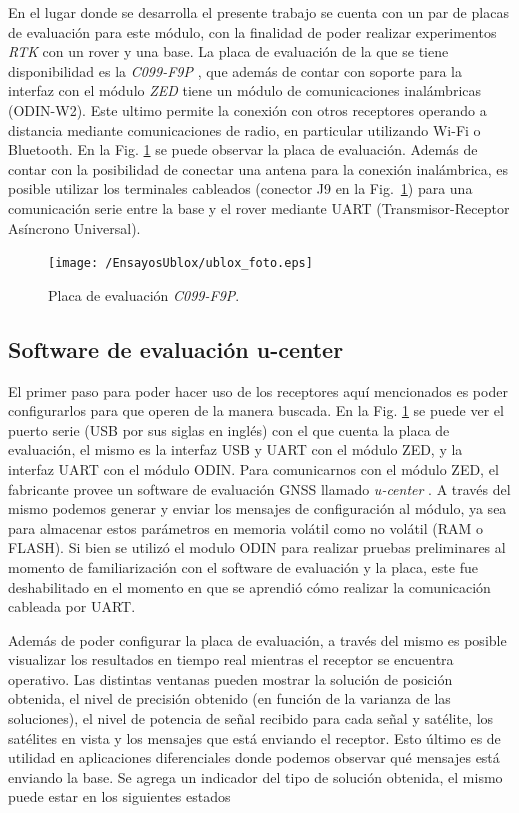 \documentclass[a4paper,12pt,oneside,onecolumn,final,openright]{book}%
\begin{document}
	En el lugar donde se desarrolla el presente trabajo se cuenta con un par de placas de evaluación para este módulo, con la finalidad de poder realizar experimentos \textit{RTK} con un rover y una base. La placa de evaluación de la que se tiene disponibilidad es la \textit{C099-F9P} \cite{C099_ds}, que además de contar con soporte para la interfaz con el módulo \textit{ZED} tiene un módulo de comunicaciones inalámbricas (ODIN-W2). Este ultimo permite la conexión con otros receptores operando a distancia mediante comunicaciones de radio, en particular utilizando Wi-Fi o Bluetooth. En la Fig. \ref{fig:EvBoard} se puede observar la placa de evaluación. Además de contar con la posibilidad de conectar una antena para la conexión inalámbrica, es posible utilizar los terminales cableados (conector J9 en la Fig.~\ref{fig:EvBoard}) para una comunicación serie entre la base y el rover mediante UART (Transmisor-Receptor Asíncrono Universal).
	
\begin{figure}
    \centering
    \texttt{[image: /EnsayosUblox/ublox\_foto.eps]}
    \caption{Placa de evaluación \textit{C099-F9P}.}
    \label{fig:EvBoard}
\end{figure}
\subsection{Software de evaluación u-center}\label{sec:ucenter}
	El primer paso para poder hacer uso de los receptores aquí mencionados es poder configurarlos para que operen de la manera buscada. En la Fig. \ref{fig:EvBoard} se puede ver el puerto serie (USB por sus siglas en inglés) con el que cuenta la placa de evaluación, el mismo es la interfaz USB y UART con el módulo ZED, y la interfaz UART con el módulo ODIN. Para comunicarnos con el módulo ZED, el fabricante provee un software de evaluación GNSS llamado \textit{u-center} \cite{u_center}. A través del mismo podemos generar y enviar los mensajes de configuración al módulo, ya sea para almacenar estos parámetros en memoria volátil como no volátil (RAM o FLASH). Si bien se utilizó el modulo ODIN para realizar pruebas preliminares al momento de familiarización con el software de evaluación y la placa, este fue deshabilitado en el momento en que se aprendió cómo realizar la comunicación cableada por UART.
	
	Además de poder configurar la placa de evaluación, a través del mismo es posible visualizar los resultados en tiempo real mientras el receptor se encuentra operativo. Las distintas ventanas pueden mostrar la solución de posición obtenida, el nivel de precisión obtenido (en función de la varianza de las soluciones), el nivel de potencia de señal recibido para cada señal y satélite, los satélites en vista y los mensajes que está enviando el receptor. Esto último es de utilidad en aplicaciones diferenciales donde podemos observar qué mensajes está enviando la base. Se agrega un indicador del tipo de solución obtenida, el mismo puede estar en los siguientes estados
\end{document}
